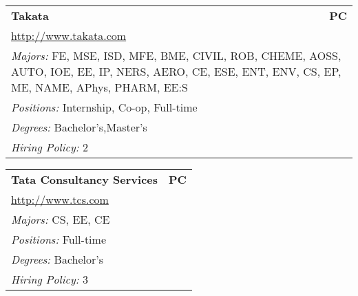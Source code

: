 \documentclass[twoside]{article}
\begin{document}
\begin{center}
\begin{multicols}{3}
\begin{FlushLeft}
\begin{minipage}{\columnwidth}
\end{minipage}
 
\begin{minipage}{\columnwidth}\begin{tabularx}{.95\columnwidth}{Xr}
                 {\Large\bf Takata} & {\Large\bf PC}\\
    \multicolumn{2}{p{.95\columnwidth}}{\url{http://www.takata.com}}\\
    \multicolumn{2}{p{.95\columnwidth}}{\emph{Majors:} FE, MSE, ISD, MFE, BME, CIVIL, ROB, CHEME, AOSS, AUTO, IOE, EE, IP, NERS, AERO, CE, ESE, ENT, ENV, CS, EP, ME, NAME, APhys, PHARM, EE:S}\\
    \multicolumn{2}{p{.95\columnwidth}}{\emph{Positions:} Internship, Co-op, Full-time}\\
    \multicolumn{2}{p{.95\columnwidth}}{\emph{Degrees:} Bachelor's,Master's}\\
    \multicolumn{2}{p{.95\columnwidth}}{\emph{Hiring Policy:} 2}\\
    \end{tabularx}
    
\end{minipage}
 
\begin{minipage}{\columnwidth}\begin{tabularx}{.95\columnwidth}{Xr}
                 {\Large\bf Tata Consultancy Services} & {\Large\bf PC}\\
    \multicolumn{2}{p{.95\columnwidth}}{\url{http://www.tcs.com}}\\
    \multicolumn{2}{p{.95\columnwidth}}{\emph{Majors:} CS, EE, CE}\\
    \multicolumn{2}{p{.95\columnwidth}}{\emph{Positions:} Full-time}\\
    \multicolumn{2}{p{.95\columnwidth}}{\emph{Degrees:} Bachelor's}\\
    \multicolumn{2}{p{.95\columnwidth}}{\emph{Hiring Policy:} 3}\\
    \end{tabularx}
    
\end{minipage}
 

\end{FlushLeft}
\end{multicols}
\end{center}
\end{document}
